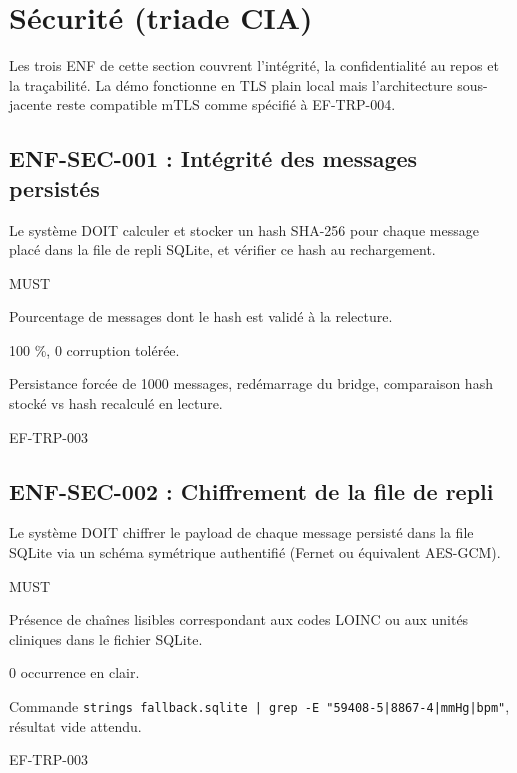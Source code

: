 \section{Sécurité (triade CIA)}
\label{sec:enf-securite}

Les trois ENF de cette section couvrent l'intégrité, la confidentialité au repos et la traçabilité. La démo fonctionne en TLS plain local mais l'architecture sous-jacente reste compatible mTLS comme spécifié à EF-TRP-004.

\subsection*{ENF-SEC-001 : Intégrité des messages persistés}
\begin{description}[leftmargin=2.5cm, style=nextline]
  \item[Énoncé] Le système DOIT calculer et stocker un hash SHA-256 pour chaque message placé dans la file de repli SQLite, et vérifier ce hash au rechargement.
  \item[Priorité] MUST
  \item[Métrique] Pourcentage de messages dont le hash est validé à la relecture.
  \item[Cible] 100 \%, 0 corruption tolérée.
  \item[Mesure] Persistance forcée de 1000 messages, redémarrage du bridge, comparaison hash stocké vs hash recalculé en lecture.
  \item[Lié à] EF-TRP-003
\end{description}

\subsection*{ENF-SEC-002 : Chiffrement de la file de repli}
\begin{description}[leftmargin=2.5cm, style=nextline]
  \item[Énoncé] Le système DOIT chiffrer le payload de chaque message persisté dans la file SQLite via un schéma symétrique authentifié (Fernet ou équivalent AES-GCM).
  \item[Priorité] MUST
  \item[Métrique] Présence de chaînes lisibles correspondant aux codes LOINC ou aux unités cliniques dans le fichier SQLite.
  \item[Cible] 0 occurrence en clair.
  \item[Mesure] Commande \texttt{strings fallback.sqlite | grep -E "59408-5|8867-4|mmHg|bpm"}, résultat vide attendu.
  \item[Lié à] EF-TRP-003
\end{description}

